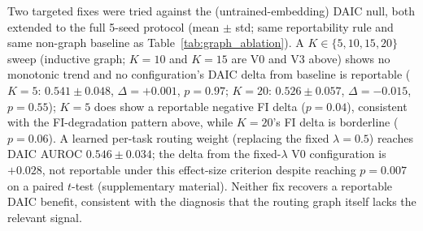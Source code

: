 \documentclass[letterpaper]{article}
\begin{document}
\begin{table}[t]
    \centering
    \footnotesize
    \caption{Real graph neighbours vs.\ random pairing. "Untrained embedding" is the representation used to build every V0--V4 routing graph (random projection of raw features, averaged over the 4 leakage-safe variants). "Trained representation" recomputes the same diagnostic on the corresponding checkpoint's fused representation (mean over 6 checkpoints -- the 5 canonical seeds plus one checkpoint retained from before the canonical-seed protocol was adopted -- $\times$ 4 variants; DAIC split by graph topology, Section~\ref{sec:routing-ablation}).}
    \label{tab:homophily}
\end{table}

Two targeted fixes were tried against the (untrained-embedding) DAIC null, both extended to the full 5-seed protocol (mean $\pm$ std; same reportability rule and same non-graph baseline as Table~\ref{tab:graph_ablation}). A $K\in\{5,10,15,20\}$ sweep (inductive graph; $K{=}10$ and $K{=}15$ are V0 and V3 above) shows no monotonic trend and no configuration's DAIC delta from baseline is reportable ($K{=}5$: $0.541\pm0.048$, $\Delta{=}{+}0.001$, $p{=}0.97$; $K{=}20$: $0.526\pm0.057$, $\Delta{=}{-}0.015$, $p{=}0.55$); $K{=}5$ does show a reportable negative FI delta ($p{=}0.04$), consistent with the FI-degradation pattern above, while $K{=}20$'s FI delta is borderline ($p{=}0.06$). A learned per-task routing weight (replacing the fixed $\lambda{=}0.5$) reaches DAIC AUROC $0.546\pm0.034$; the delta from the fixed-$\lambda$ V0 configuration is $+0.028$, not reportable under this effect-size criterion despite reaching $p{=}0.007$ on a paired $t$-test (supplementary material). Neither fix recovers a reportable DAIC benefit, consistent with the diagnosis that the routing graph itself lacks the relevant signal.
\end{document}
